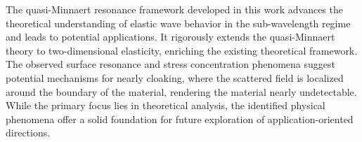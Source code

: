 \documentclass[11pt,reqno,twoside]{amsart}
\theoremstyle{definition}
\theoremstyle{remark}
\numberwithin{equation}{section}
\begin{document}


The quasi-Minnaert resonance framework developed in this work advances the theoretical understanding of elastic wave behavior in the sub-wavelength regime and leads to potential applications. It rigorously extends the quasi-Minnaert theory to two-dimensional elasticity, enriching the existing theoretical framework. The observed surface resonance and stress concentration phenomena suggest potential mechanisms for nearly cloaking, where the scattered field is localized around the boundary of the material, rendering the material nearly undetectable.  While the primary focus lies in theoretical analysis, the identified physical phenomena offer a solid foundation for future exploration of application-oriented directions.
\end{document}
